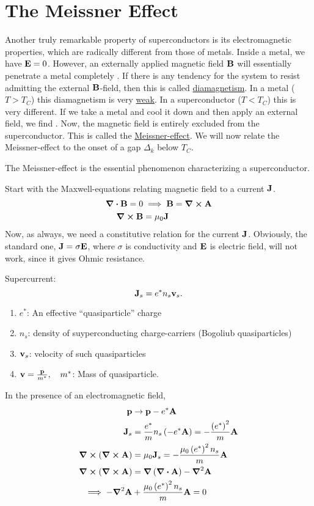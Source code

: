 \section{The Meissner Effect}
Another truly remarkable property of superconductors is its electromagnetic properties, which are radically different from those of metals.
Inside a metal, we have $\vb E = 0$. However, an externally applied magnetic field $\vb B$ will essentially penetrate a metal completely
.
If there is any tendency for the system to resist admitting the external $\vb B$-field, then this is called \underline{diamagnetism}. In a metal ($T>T_C$) this diamagnetism is very \underline{weak}. In a superconductor ($T<T_C$) this is very different. If we take a metal and cool it down and then apply an external field, we find .
Now, the magnetic field is entirely excluded from the superconductor. This is called the \underline{Meissner-effect}. 
We will now relate the Meissner-effect to the onset of a gap $\Delta_k$ below $T_C$. 
\begin{tcolorbox}
	The Meissner-effect is the essential phenomenon characterizing a superconductor.
\end{tcolorbox}
Start with the Maxwell-equations relating magnetic field to a current $\vb J$.
\begin{align}
	\div{\vb B} = 0 &\implies \vb B =\curl{\vb A} \\
	\curl{\vb B} &= \mu_0\vb J	
\end{align}
Now, as always, we need a constitutive relation for the current $\vb J$. Obviously, the standard one, $\vb J = \sigma \vb E$, where $\sigma$ is conductivity and $\vb E$ is electric field, will not work, since it gives Ohmic resistance.

Supercurrent:
\begin{equation} 
\vb J_s = e^*n_s\vb v_s.
\end{equation}
\begin{enumerate}[]
	\item $e^*$: An effective ``quasiparticle'' charge
	\item $n_s$: density of suyperconducting charge-carriers (Bogoliub quasiparticles)
	\item $\vb v_s$: velocity of such quasiparticles
	\item $\vb v = \frac{\vb p}{m^*},\quad m^*$: Mass of quasiparticle.
\end{enumerate}
In the presence of an electromagnetic field,
\begin{align} 
\vb p &\rightarrow \vb p - e^*\vb A\\
\vb J_s &= \frac{e^*}{m}n_s\left( -e^*\vb A \right) = -\frac{\left(e^*\right)^2}{m}\vb A \\
\curl{(\curl{\vb A})} &= \mu_0\vb J_s = -\frac{\mu_0\left( e^* \right)^2n_s}{m}\vb A\\
\curl{\left( \curl{\vb A \right)}} &= \grad{\left( \div{\vb A} \right)} -\grad^2\vb A \\
\implies -\grad^2\vb A &+  \frac{\mu_0\left( e^* \right)^2n_s}{m}\vb A = 0
\end{align}

